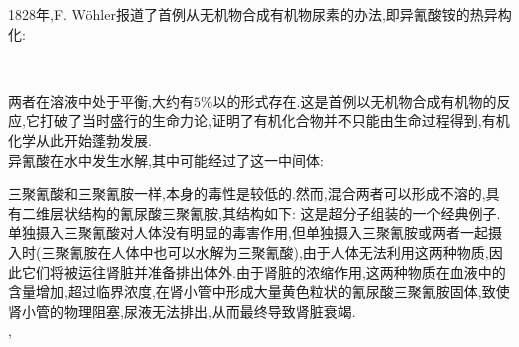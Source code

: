 \documentclass{ctexart}
\begin{document}
\indent 1828年,F. Wöhler报道了首例从无机物合成有机物尿素的办法,即异氰酸铵的热异构化:
\begin{center}
    \\
\end{center}
两者在溶液中处于平衡,大约有$5\%$以的形式存在.这是首例以无机物合成有机物的反应,它打破了当时盛行的生命力论,证明了有机化合物并不只能由生命过程得到,有机化学从此开始蓬勃发展.\\
\indent 异氰酸在水中发生水解,其中可能经过了这一中间体:
\begin{center}
\end{center}
\indent 三聚氰酸和三聚氰胺一样,本身的毒性是较低的.然而,混合两者可以形成不溶的,具有二维层状结构的氰尿酸三聚氰胺,其结构如下:
这是超分子组装的一个经典例子.单独摄入三聚氰酸对人体没有明显的毒害作用,但单独摄入三聚氰胺或两者一起摄入时(三聚氰胺在人体中也可以水解为三聚氰酸),由于人体无法利用这两种物质,因此它们将被运往肾脏并准备排出体外.由于肾脏的浓缩作用,这两种物质在血液中的含量增加,超过临界浓度,在肾小管中形成大量黄色粒状的氰尿酸三聚氰胺固体,致使肾小管的物理阻塞,尿液无法排出,从而最终导致肾脏衰竭.\\
,
\end{document}

